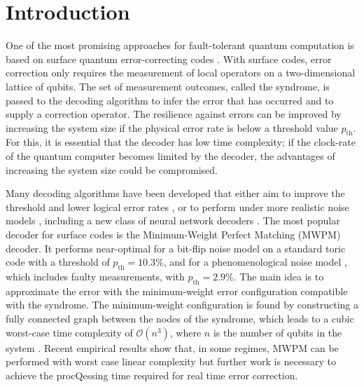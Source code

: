 \section{Introduction}\label{sec:introduction}
One of the most promising approaches for fault-tolerant quantum computation is based on surface quantum error-correcting codes \cite{dennis2002topological, kitaev2003fault}. With surface codes, error correction only requires the measurement of local operators on a two-dimensional lattice of qubits. The set of measurement outcomes, called the syndrome, is passed to the decoding algorithm to infer the error that has occurred and to supply a correction operator. The resilience against errors can be improved by increasing the system size if the physical error rate is below a threshold value $p_{\text{th}}$. For this, it is essential that the decoder has low time complexity; if the clock-rate of the quantum computer becomes limited by the decoder, the advantages of increasing the system size could be compromised.

Many decoding algorithms have been developed that either aim to improve the threshold and lower logical error rates \cite{wang2003confinement, raussendorf2007faulttolerant, fowler2012towards, fowler2013minimum, heim2016optimal, duclos2010fast, duclos2013fault, bravyi2014efficient, darmawan2018linear}, or to perform under more realistic noise models \cite{tuckett2020fault, hutter2015improved, bravyi2013quantum,  nickerson2019analysing, wootton2012high, huang2020fault}, including a new class of neural network decoders \cite{baireuther2019neural, chamberland2018deep, liu2019neural, nautrup2019optimizing, torlai2017neural, varsamopoulos2017decoding, varsamopoulos2020decoding}. %
The most popular decoder for surface codes is the Minimum-Weight Perfect Matching (MWPM) decoder. It performs near-optimal for a bit-flip noise model \cite{dennis2002topological} on a standard toric code with a threshold of $p_{\text{th}} = 10.3\%$, and for a phenomenological noise model \cite{wang2003confinement}, which includes faulty measurements, with $p_{\text{th}} = 2.9\%$. The main idea is to approximate the error with the minimum-weight error configuration compatible with the syndrome. The minimum-weight configuration is found by constructing a fully connected graph between the nodes of the syndrome, which leads to a cubic worst-case time complexity of $\mathcal{O}(n^3)$, where $n$ is the number of qubits in the system \cite{kolmogorov2009blossom}. Recent empirical results show that, in some regimes, MWPM can be performed with worst case linear complexity \cite{fowler2012towards} but further work is necessary to achieve the procQessing time required for real time error correction.

